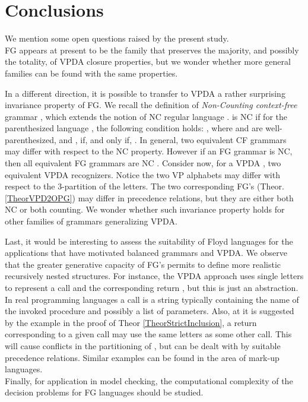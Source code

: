 \documentclass[3p,11pt]{elsarticle}
\begin{document}
\section{Conclusions}\label{SectConclusion}
We mention some open questions raised by the present study.
\\
FG appears at present to be the family that preserves the majority, and possibly the totality, of VPDA closure properties, but we wonder whether more general families can be found with the same properties.
\par
In a different direction, it is possible to transfer to VPDA a rather surprising invariance property of FG. We recall the definition of \emph{Non-Counting context-free} grammar \cite{CreGuiMan78}, which extends the notion of NC regular language \cite{McNaughtPap71}.  is NC if for the parenthesized language , the following condition holds: , where  and  are well-parenthesized, and ,  if, and only if, . In general, two equivalent CF grammars may differ with respect to the NC property. However if an FG grammar is NC, then all equivalent FG grammars are NC \cite{CreGuiMan81}. Consider now, for a VPDA , two equivalent VPDA recognizers. Notice the two VP alphabets may differ with respect to the 3-partition of the letters. The two corresponding FG's (Theor. \ref{TheorVPD2OPG}) may differ in precedence relations, but they are either both NC or both counting. We wonder whether such invariance property holds for other families of grammars generalizing VPDA.
\par
Last, it would be interesting to assess the suitability of Floyd languages for the applications that have motivated balanced grammars and VPDA. We observe that the greater generative capacity of FG's permits to define more realistic recursively nested structures. For instance, the VPDA approach uses single letters to represent a call  and the corresponding return , but this is just an abstraction. In real programming languages a call is a string typically containing the name of the invoked procedure and possibly a list of parameters. Also, at it is suggested by the example in the proof of Theor \ref{TheorStrictInclusion}, a return corresponding to a given call may use the same letters as some other call. This will cause conflicts in the partitioning of , but can be dealt with by suitable precedence relations. Similar examples can be found in the area of mark-up languages.
\\
Finally, for application in model checking, the computational complexity of the decision problems for FG languages should be studied.





\end{document}
